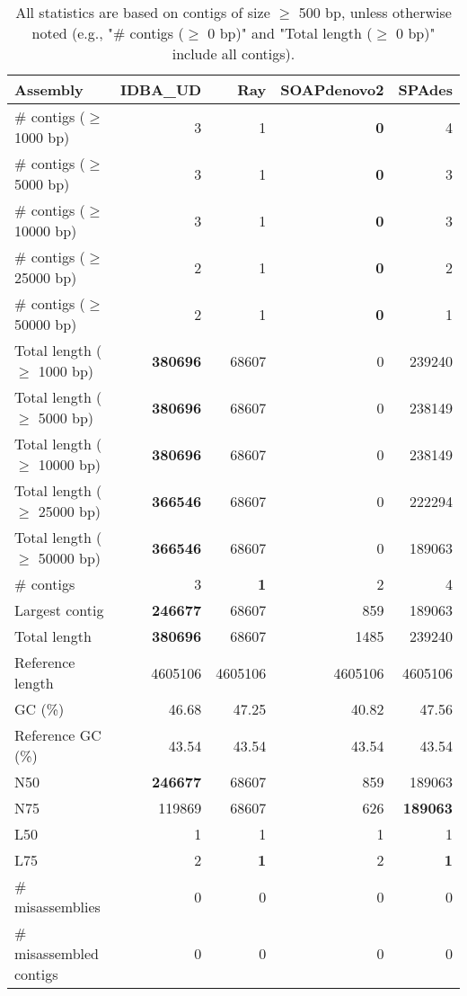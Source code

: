 \documentclass[12pt,a4paper]{article}
\begin{document}
\begin{table}[ht]
\begin{center}
\caption{All statistics are based on contigs of size $\geq$ 500 bp, unless otherwise noted (e.g., "\# contigs ($\geq$ 0 bp)" and "Total length ($\geq$ 0 bp)" include all contigs).}
\begin{tabular}{|l*{4}{|r}|}
\hline
Assembly & IDBA\_UD & Ray & SOAPdenovo2 & SPAdes \\ \hline
\# contigs ($\geq$ 1000 bp) & 3 & 1 & {\bf 0} & 4 \\ \hline
\# contigs ($\geq$ 5000 bp) & 3 & 1 & {\bf 0} & 3 \\ \hline
\# contigs ($\geq$ 10000 bp) & 3 & 1 & {\bf 0} & 3 \\ \hline
\# contigs ($\geq$ 25000 bp) & 2 & 1 & {\bf 0} & 2 \\ \hline
\# contigs ($\geq$ 50000 bp) & 2 & 1 & {\bf 0} & 1 \\ \hline
Total length ($\geq$ 1000 bp) & {\bf 380696} & 68607 & 0 & 239240 \\ \hline
Total length ($\geq$ 5000 bp) & {\bf 380696} & 68607 & 0 & 238149 \\ \hline
Total length ($\geq$ 10000 bp) & {\bf 380696} & 68607 & 0 & 238149 \\ \hline
Total length ($\geq$ 25000 bp) & {\bf 366546} & 68607 & 0 & 222294 \\ \hline
Total length ($\geq$ 50000 bp) & {\bf 366546} & 68607 & 0 & 189063 \\ \hline
\# contigs & 3 & {\bf 1} & 2 & 4 \\ \hline
Largest contig & {\bf 246677} & 68607 & 859 & 189063 \\ \hline
Total length & {\bf 380696} & 68607 & 1485 & 239240 \\ \hline
Reference length & 4605106 & 4605106 & 4605106 & 4605106 \\ \hline
GC (\%) & 46.68 & 47.25 & 40.82 & 47.56 \\ \hline
Reference GC (\%) & 43.54 & 43.54 & 43.54 & 43.54 \\ \hline
N50 & {\bf 246677} & 68607 & 859 & 189063 \\ \hline
N75 & 119869 & 68607 & 626 & {\bf 189063} \\ \hline
L50 & 1 & 1 & 1 & 1 \\ \hline
L75 & 2 & {\bf 1} & 2 & {\bf 1} \\ \hline
\# misassemblies & 0 & 0 & 0 & 0 \\ \hline
\# misassembled contigs & 0 & 0 & 0 & 0 \\ \hline

\end{tabular}
\end{center}
\end{table}
\end{document}
